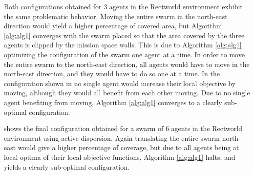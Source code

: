 Both configurations obtained for 3 agents in the Rectworld environment exhibit the same problematic behavior. Moving the entire swarm in the north-east direction would yield a higher percentage of covered area,
but Algorithm \ref{alg:alg1} converges with the swarm placed so that the area covered by the three agents is clipped by the mission space walls. This is due to Algorithm \ref{alg:alg1} optimizing
the configuration of the swarm one agent at a time. In order to move the entire swarm to the north-east direction, all agents would have to move in the north-east direction, and they
would have to do so one at a time. In the configuration shown in  no single agent would increase their local objective by moving, although they would all benefit from each other moving.
Due to no single agent benefiting from moving, Algorithm \ref{alg:alg1} converges to a clearly sub-optimal configuration.

 shows the final configuration obtained for a swarm of 6 agents in the Rectworld environment using active dispersion. Again translating the
entire swarm north-east would give a higher percentage of coverage, but due to all agents being at local optima of their local objective functions, Algorithm \ref{alg:alg1} halts, and yields
a clearly sub-optimal configuration.